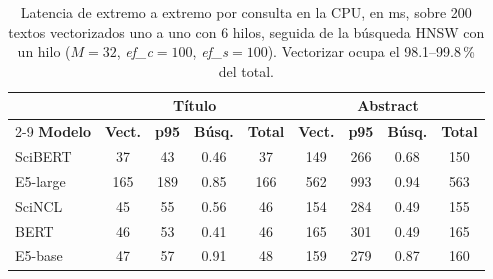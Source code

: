\begin{table}[tbp]
\caption{Latencia de extremo a extremo por consulta en la CPU, en ms, sobre 200 textos vectorizados uno a uno con 6 hilos, seguida de la búsqueda HNSW con un hilo ($M=32$, \textit{ef\_c}$=100$, \textit{ef\_s}$=100$). Vectorizar ocupa el 98.1--99.8\,\% del total.}\label{tab:e2e}
\centering
\small
\begin{tabular}{|l|c|c|c|c|c|c|c|c|}
\hline
 & \multicolumn{4}{c|}{\textbf{Título}} & \multicolumn{4}{c|}{\textbf{Abstract}} \\ \cline{2-9}
\textbf{Modelo} & \textbf{Vect.} & \textbf{p95} & \textbf{Búsq.} & \textbf{Total} & \textbf{Vect.} & \textbf{p95} & \textbf{Búsq.} & \textbf{Total} \\
\hline
SciBERT & 37 & 43 & 0.46 & 37 & 149 & 266 & 0.68 & 150 \\
E5-large & 165 & 189 & 0.85 & 166 & 562 & 993 & 0.94 & 563 \\
SciNCL & 45 & 55 & 0.56 & 46 & 154 & 284 & 0.49 & 155 \\
BERT & 46 & 53 & 0.41 & 46 & 165 & 301 & 0.49 & 165 \\
E5-base & 47 & 57 & 0.91 & 48 & 159 & 279 & 0.87 & 160 \\
\hline
\end{tabular}
\end{table}